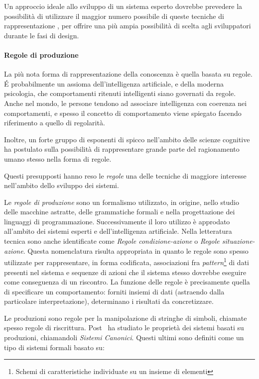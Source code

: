 Un approccio ideale allo sviluppo di un sistema esperto dovrebbe prevedere la possibilità di utilizzare il maggior numero possibile di queste tecniche di rappresentazione \cite{development1993}, per offrire una più ampia possibilità di scelta agli sviluppatori durante le fasi di design.

\paragraph{Regole di produzione}
La più nota forma di rappresentazione della conoscenza è quella basata su regole. \'E probabilmente un assioma dell'intelligenza artificiale, e della moderna psicologia, che comportamenti ritenuti intelligenti siano governati da regole. Anche nel mondo, le persone tendono ad associare intelligenza con coerenza nei comportamenti, e spesso il concetto di comportamento viene spiegato facendo riferimento a quello di regolarità.~\cite{jackson1999}

Inoltre, un forte gruppo di esponenti di spicco nell'ambito delle scienze cognitive ha postulato sulla possibilità di rappresentare grande parte del ragionamento umano stesso nella forma di regole.~\cite{anderson1993rules}

Questi presupposti hanno reso le \emph{regole} una delle tecniche di maggiore interesse nell'ambito dello sviluppo dei sistemi.

Le \emph{regole di produzione} sono un formalismo utilizzato, in origine, nello studio delle macchine astratte, delle grammatiche formali e nella progettazione dei linguaggi di programmazione. Successivamente il loro utilizzo è approdato all'ambito dei sistemi esperti e dell'intelligenza artificiale. Nella letteratura tecnica sono anche identificate come \emph{Regole condizione-azione} o \emph{Regole situazione-azione}. Questa nomenclatura risulta appropriata in quanto le regole sono spesso utilizzate per rappresentare, in forma codificata, associazioni fra \emph{pattern}\footnote{Schemi di caratteristiche individuate su un insieme di elementi} di dati presenti nel sistema e sequenze di azioni che il sistema stesso dovrebbe eseguire come conseguenza di un riscontro. La funzione delle regole è precisamente quella di specificare un comportamento: forniti insiemi di dati (astraendo dalla particolare interpretazione), determinano i risultati da concretizzare.

Le produzioni sono regole per la manipolazione di stringhe di simboli, chiamate spesso regole di riscrittura. Post~\cite{post1943} ha studiato le proprietà dei sistemi basati su produzioni, chiamandoli \emph{Sistemi Canonici}. Questi ultimi sono definiti come un tipo di sistemi formali basato su:


